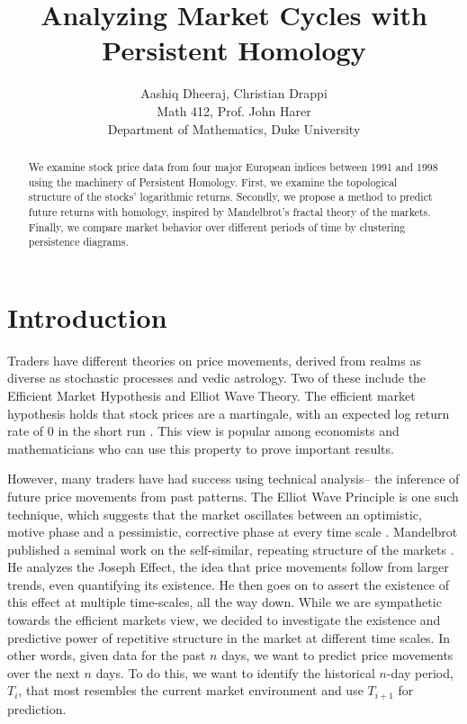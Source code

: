 \documentclass{article}
\title{Analyzing Market Cycles with Persistent Homology}
\author{
Aashiq Dheeraj, Christian Drappi \\
Math 412, Prof. John Harer \\
Department of Mathematics, Duke University
}
\begin{document}
\large

\maketitle

\begin{abstract}
We examine stock price data from four major European indices between 1991 and 1998 using the machinery of Persistent Homology. First, we examine the topological structure of the stocks' logarithmic returns. Secondly, we propose a method to predict future returns with homology, inspired by Mandelbrot's fractal theory of the markets. Finally, we compare market behavior over different periods of time by clustering persistence diagrams.
\end{abstract}

\newpage

\section{Introduction}
Traders have different theories on price movements, derived from realms as diverse as stochastic processes and vedic astrology. Two of these include the Efficient Market Hypothesis and Elliot Wave Theory. The efficient market hypothesis holds that stock prices are a martingale, with an expected log return rate of 0 in the short run \cite{samuelson1965}. This view is popular among economists and mathematicians who can use this property to prove important results. 

However, many traders have had success using technical analysis-- the inference of future price movements from past patterns. The Elliot Wave Principle is one such technique, which suggests that the market oscillates between an optimistic, motive phase and a pessimistic, corrective phase at every time scale \cite{frost2005}. Mandelbrot published a seminal work on the self-similar, repeating structure of the markets \cite{mandelbrot2005}. He analyzes the Joseph Effect, the idea that price movements follow from larger trends, even quantifying its existence. He then goes on to assert the existence of this effect at multiple time-scales, all the way down.  While we are sympathetic towards the efficient markets view, we decided to investigate the existence and predictive power of repetitive structure in the market at different time scales. In other words, given data for the past $n$ days, we want to predict price movements over the next $n$ days. To do this, we want to identify the historical $n$-day period, $T_i$,  that most resembles the current market environment and use $T_{i+1}$ for prediction.
\end{document}
